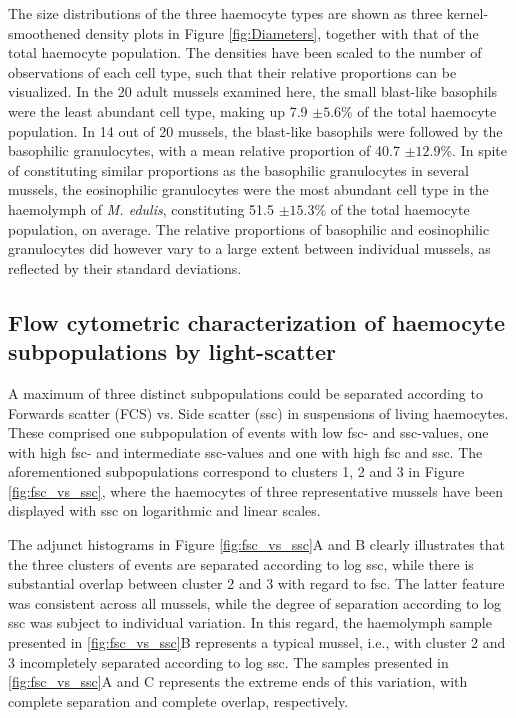 The size distributions of the three haemocyte types are shown as three kernel-smoothened density plots in Figure \ref{fig:Diameters}, together with that of the total haemocyte population. The densities have been scaled to the number of observations of each cell type, such that their relative proportions can be visualized. In the 20 adult mussels examined here, the small blast-like basophils were the least abundant cell type, making up 7.9 $\pm{5.6}$\% of the total haemocyte population. In 14 out of 20 mussels, the blast-like basophils were followed by the basophilic granulocytes, with a mean relative proportion of 40.7 $\pm{12.9}$\%. In spite of constituting similar proportions as the basophilic granulocytes in several mussels, the eosinophilic granulocytes were the most abundant cell type in the haemolymph of \emph{M. edulis}, constituting 51.5 $\pm{15.3}$\% of the total haemocyte population, on average. The relative proportions of basophilic and eosinophilic granulocytes did however vary to a large extent between individual mussels, as reflected by their standard deviations.

\subsection{Flow cytometric characterization of haemocyte subpopulations by light-scatter}
\label{subsection:Results_FlowChar}
A maximum of three distinct subpopulations could be separated according to Forwards scatter (FCS) vs. Side scatter (\acrshort{ssc}) in suspensions of living haemocytes. These comprised one subpopulation of events with low \acrshort{fsc}- and \acrshort{ssc}-values, one with high \acrshort{fsc}- and intermediate \acrshort{ssc}-values and one with high \acrshort{fsc} and \acrshort{ssc}. The aforementioned subpopulations correspond to clusters 1, 2 and 3 in Figure \ref{fig:fsc_vs_ssc}, where the haemocytes of three representative mussels have been displayed with \acrshort{ssc} on logarithmic and linear scales.

The adjunct histograms in Figure \ref{fig:fsc_vs_ssc}A and B clearly illustrates that the three clusters of events are separated according to log \acrshort{ssc}, while there is substantial overlap between cluster 2 and 3 with regard to \acrshort{fsc}. The latter feature was consistent across all mussels, while the degree of separation according to log \acrshort{ssc} was subject to individual variation. In this regard, the haemolymph sample presented in \ref{fig:fsc_vs_ssc}B represents a typical mussel, i.e., with cluster 2 and 3 incompletely separated according to log \acrshort{ssc}. The samples presented in \ref{fig:fsc_vs_ssc}A and C represents the extreme ends of this variation, with complete separation and complete overlap, respectively.

